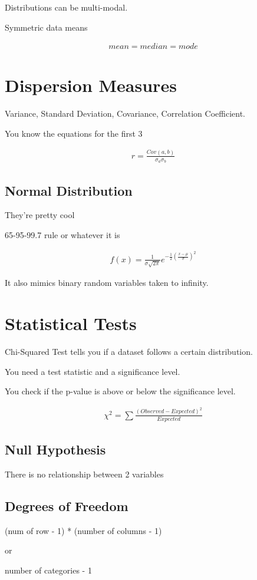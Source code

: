 \documentclass[fleqn]{report}
\newcommand{\equations} [1] {
\begin{gather*}
#1
\end{gather*}
}
\begin{document}
Distributions can be multi-modal. 

Symmetric data means 

\equations{
    mean = median = mode
}

\section{Dispersion Measures}
Variance, Standard Deviation, Covariance, Correlation Coefficient. 

You know the equations for the first 3 

\equations{
    r 
    =
    \frac{ Cov(a, b) } {\sigma_a \sigma_b} 
}

\subsection{Normal Distribution}
They're pretty cool 

65-95-99.7 rule or whatever it is 

\equations{
    f(x)
    =
    \frac{1}{\sigma \sqrt{2 \pi}}
    e^{
        -\frac{1}{2} (\frac{x - \mu}{\sigma})^2
    }
}

It also mimics binary random variables taken to infinity.

\section{Statistical Tests}
Chi-Squared Test tells you if a dataset follows a certain distribution. 

You need a test statistic and a significance level. 

You check if the p-value is above or below the significance level.

\equations{
    \chi^2 
    =
    \sum 
    \frac{(Observed - Expected)^2}{Expected}
}

\subsection{Null Hypothesis}
There is no relationship between 2 variables

\subsection{Degrees of Freedom}
(num of row - 1) * (number of columns - 1)

or 

number of categories - 1
\end{document}
